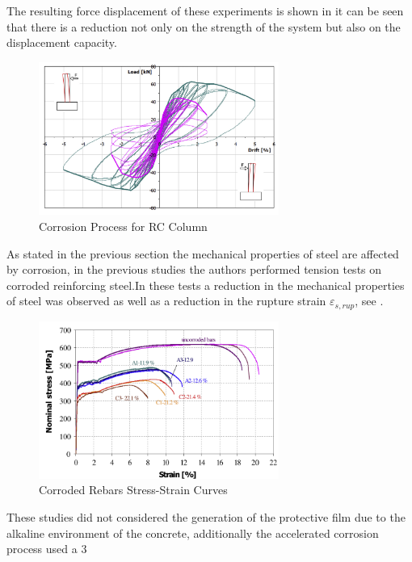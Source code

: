 The resulting force displacement of these experiments is shown in  it can be seen that there is a reduction not only on the strength of the system but also on the displacement capacity. 

\begin{figure}[htbp]
	\centering
	\includegraphics[width=0.7\textwidth]{Chapter-4/figs/Meda_F-D_01}
	\caption{Corrosion Process for RC Column \cite{Meda2014}}
	\label{fig:Meda_FD}
\end{figure}

As stated in the previous section the mechanical properties of steel are affected by corrosion, in the previous studies \cite{Meda2014} the authors performed tension tests on corroded reinforcing steel.In these tests a reduction in the mechanical properties of steel was observed as well as a reduction in the rupture strain $\varepsilon_{s,rup}$, see \fref{}. 

\begin{figure}[htbp]
	\centering
	\includegraphics[width=0.7\textwidth]{Chapter-4/figs/Meda_StressStrain}
	\caption{Corroded Rebars Stress-Strain Curves \cite{Meda2014}}
	\label{fig:Meda_FD}
\end{figure}

These studies did not considered the generation of the protective film due to the alkaline environment of the concrete, additionally the accelerated corrosion process used a 3%

